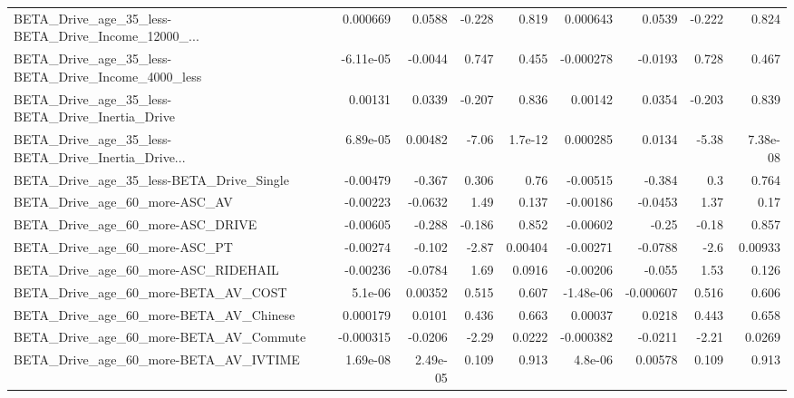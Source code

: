 \begin{tabular}{lrrrrrrrr}
BETA\_Drive\_age\_35\_less-BETA\_Drive\_Income\_12000\_... &    0.000669 &       0.0588 &   -0.228 &    0.819 &   0.000643 &      0.0539 &       -0.222 &         0.824 \\
BETA\_Drive\_age\_35\_less-BETA\_Drive\_Income\_4000\_less &   -6.11e-05 &      -0.0044 &    0.747 &    0.455 &  -0.000278 &     -0.0193 &        0.728 &         0.467 \\
BETA\_Drive\_age\_35\_less-BETA\_Drive\_Inertia\_Drive    &     0.00131 &       0.0339 &   -0.207 &    0.836 &    0.00142 &      0.0354 &       -0.203 &         0.839 \\
BETA\_Drive\_age\_35\_less-BETA\_Drive\_Inertia\_Drive... &    6.89e-05 &      0.00482 &    -7.06 &  1.7e-12 &   0.000285 &      0.0134 &        -5.38 &      7.38e-08 \\
BETA\_Drive\_age\_35\_less-BETA\_Drive\_Single           &    -0.00479 &       -0.367 &    0.306 &     0.76 &   -0.00515 &      -0.384 &          0.3 &         0.764 \\
BETA\_Drive\_age\_60\_more-ASC\_AV                      &    -0.00223 &      -0.0632 &     1.49 &    0.137 &   -0.00186 &     -0.0453 &         1.37 &          0.17 \\
BETA\_Drive\_age\_60\_more-ASC\_DRIVE                   &    -0.00605 &       -0.288 &   -0.186 &    0.852 &   -0.00602 &       -0.25 &        -0.18 &         0.857 \\
BETA\_Drive\_age\_60\_more-ASC\_PT                      &    -0.00274 &       -0.102 &    -2.87 &  0.00404 &   -0.00271 &     -0.0788 &         -2.6 &       0.00933 \\
BETA\_Drive\_age\_60\_more-ASC\_RIDEHAIL                &    -0.00236 &      -0.0784 &     1.69 &   0.0916 &   -0.00206 &      -0.055 &         1.53 &         0.126 \\
BETA\_Drive\_age\_60\_more-BETA\_AV\_COST                &     5.1e-06 &      0.00352 &    0.515 &    0.607 &  -1.48e-06 &   -0.000607 &        0.516 &         0.606 \\
BETA\_Drive\_age\_60\_more-BETA\_AV\_Chinese             &    0.000179 &       0.0101 &    0.436 &    0.663 &    0.00037 &      0.0218 &        0.443 &         0.658 \\
BETA\_Drive\_age\_60\_more-BETA\_AV\_Commute             &   -0.000315 &      -0.0206 &    -2.29 &   0.0222 &  -0.000382 &     -0.0211 &        -2.21 &        0.0269 \\
BETA\_Drive\_age\_60\_more-BETA\_AV\_IVTIME              &    1.69e-08 &     2.49e-05 &    0.109 &    0.913 &    4.8e-06 &     0.00578 &        0.109 &         0.913 \\

\end{tabular}
